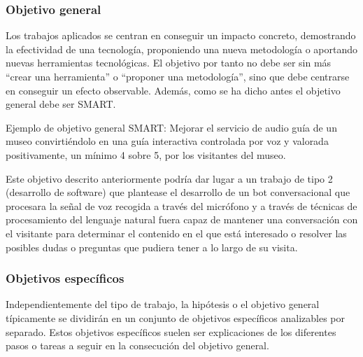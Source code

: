 \subsubsection{Objetivo general}

Los trabajos aplicados se centran en conseguir un impacto concreto, demostrando la efectividad de una tecnología, proponiendo una nueva metodología o aportando nuevas herramientas tecnológicas.
El objetivo por tanto no debe ser sin más “crear una herramienta” o “proponer una metodología”, sino que debe centrarse en conseguir un efecto observable.
Además, como se ha dicho antes el objetivo general debe ser SMART\@.

Ejemplo de objetivo general SMART: Mejorar el servicio de audio guía de un museo convirtiéndolo en una guía interactiva controlada por voz y valorada positivamente, un mínimo 4 sobre 5, por los visitantes del museo.

Este objetivo descrito anteriormente podría dar lugar a un trabajo de tipo 2 (desarrollo de software) que plantease el desarrollo de un bot conversacional que procesara la señal de voz recogida a través del micrófono y a través de técnicas de procesamiento del lenguaje natural fuera capaz de mantener una conversación con el visitante para determinar el contenido en el que está interesado o resolver las posibles dudas o preguntas que pudiera tener a lo largo de su visita.

\subsubsection{Objetivos específicos}

Independientemente del tipo de trabajo, la hipótesis o el objetivo general típicamente se dividirán en un conjunto de objetivos específicos analizables por separado.
Estos objetivos específicos suelen ser explicaciones de los diferentes pasos o tareas a seguir en la consecución del objetivo general.

